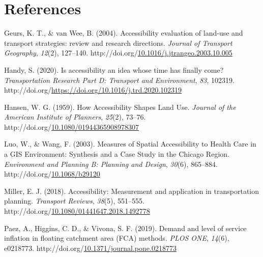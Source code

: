 \documentclass[
11pt, %
oneside, %
english, %
singlespacing, %
]{macthesis} %
\newlength{\cslhangindent}
\newenvironment{CSLReferences}[2] %
{\begin{list}{}{%
	\setlength{\itemindent}{0pt}
	\setlength{\leftmargin}{0pt}
	\setlength{\parsep}{0pt}
	\ifodd #1
	\setlength{\leftmargin}{\cslhangindent}
	\setlength{\itemindent}{-1\cslhangindent}
	\fi
	\setlength{\itemsep}{#2\baselineskip}}}
{\end{list}}
\begin{document}
\backmatter

\chapter*{References}\label{references}


\noindent

\setlength{\parindent}{-0.20in}
\setlength{\leftskip}{0.20in}
\setlength{\parskip}{8pt}

\label{refs}
\begin{CSLReferences}{1}{0}
Geurs, K. T., \& van Wee, B. (2004). Accessibility evaluation of land-use and transport strategies: review and research directions. \emph{Journal of Transport Geography}, \emph{12}(2), 127--140. http://doi.org/\href{https://doi.org/10.1016/j.jtrangeo.2003.10.005}{10.1016/j.jtrangeo.2003.10.005}

Handy, S. (2020). Is accessibility an idea whose time has finally come? \emph{Transportation Research Part D: Transport and Environment}, \emph{83}, 102319. http://doi.org/\url{https://doi.org/10.1016/j.trd.2020.102319}

Hansen, W. G. (1959). How Accessibility Shapes Land Use. \emph{Journal of the American Institute of Planners}, \emph{25}(2), 73--76. http://doi.org/\href{https://doi.org/10.1080/01944365908978307}{10.1080/01944365908978307}

Luo, W., \& Wang, F. (2003). Measures of Spatial Accessibility to Health Care in a GIS Environment: Synthesis and a Case Study in the Chicago Region. \emph{Environment and Planning B: Planning and Design}, \emph{30}(6), 865--884. http://doi.org/\href{https://doi.org/10.1068/b29120}{10.1068/b29120}

Miller, E. J. (2018). Accessibility: Measurement and application in transportation planning. \emph{Transport Reviews}, \emph{38}(5), 551--555. http://doi.org/\href{https://doi.org/10.1080/01441647.2018.1492778}{10.1080/01441647.2018.1492778}

Paez, A., Higgins, C. D., \& Vivona, S. F. (2019). Demand and level of service inflation in floating catchment area ({FCA}) methods. \emph{{PLOS} {ONE}}, \emph{14}(6), e0218773. http://doi.org/\href{https://doi.org/10.1371/journal.pone.0218773}{10.1371/journal.pone.0218773}


\end{CSLReferences}
\end{document}
